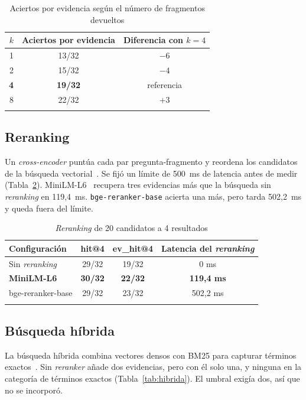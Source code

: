 \documentclass[pdflatex,sn-mathphys-num]{sn-jnl}
\begin{document}
\begin{table}[h]
\caption{Aciertos por evidencia según el número de fragmentos devueltos}\label{tab:k}
\begin{tabular}{@{}rcc@{}}
\toprule
$k$ & Aciertos por evidencia & Diferencia con $k=4$ \\
\midrule
1 & 13/32 & $-6$ \\
2 & 15/32 & $-4$ \\
\textbf{4} & \textbf{19/32} & referencia \\
8 & 22/32 & $+3$ \\
\botrule
\end{tabular}
\end{table}

\subsection{Reranking}\label{sec:res-rerank}

Un \emph{cross-encoder} puntúa cada par pregunta-fragmento y reordena los candidatos de la búsqueda vectorial~\cite{nogueira2019rerank,sbertrerank}. Se fijó un límite de 500~ms de latencia antes de medir (Tabla~\ref{tab:rerank}). MiniLM-L6~\cite{minilmcross} recupera tres evidencias más que la búsqueda sin \emph{reranking} en 119,4~ms. \texttt{bge-reranker-base} acierta una más, pero tarda 502,2~ms y queda fuera del límite.

\begin{table}[h]
\caption{\emph{Reranking} de 20 candidatos a 4 resultados}\label{tab:rerank}
\begin{tabular}{@{}lccc@{}}
\toprule
Configuración & hit@4 & ev\_hit@4 & Latencia del \emph{reranking} \\
\midrule
Sin \emph{reranking} & 29/32 & 19/32 & 0 ms \\
\textbf{MiniLM-L6} & \textbf{30/32} & \textbf{22/32} & \textbf{119,4 ms} \\
bge-reranker-base & 29/32 & 23/32 & 502,2 ms \\
\botrule
\end{tabular}
\end{table}

\subsection{Búsqueda híbrida}\label{sec:res-hibrida}

La búsqueda híbrida combina vectores densos con BM25 para capturar términos exactos~\cite{qdranthybrid}. Sin \emph{reranker} añade dos evidencias, pero con él solo una, y ninguna en la categoría de términos exactos (Tabla~\ref{tab:hibrida}). El umbral exigía dos, así que no se incorporó.
\end{document}
